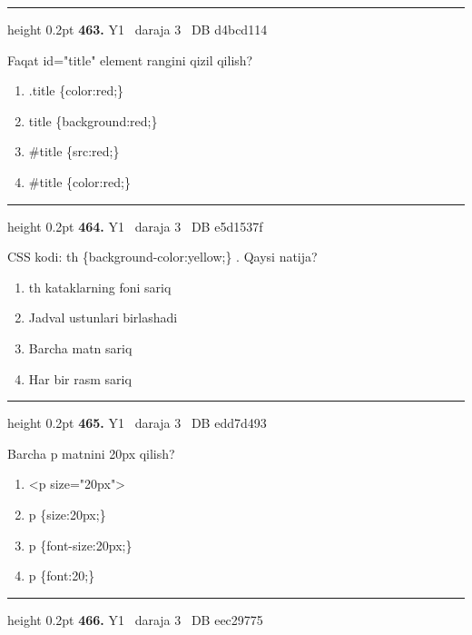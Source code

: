 \documentclass[10pt,a4paper,oneside]{article}
\begin{document}
\vspace{2mm}\hrule height 0.2pt \vspace{4mm}
\hypertarget{q463}{\textbf{\color{ink}463.}}  {\color{muted}\scriptsize Y1 \textbullet\ daraja 3 \textbullet\ DB d4bcd114}
\par
Faqat id="title" element rangini qizil qilish?
\begin{enumerate}[label=\Alph*),leftmargin=9mm]
\item .title \{color:red;\}
\item title \{background:red;\}
\item \#title \{src:red;\}
\item \#title \{color:red;\}
\end{enumerate}
\vspace{2mm}\hrule height 0.2pt \vspace{4mm}
\hypertarget{q464}{\textbf{\color{ink}464.}}  {\color{muted}\scriptsize Y1 \textbullet\ daraja 3 \textbullet\ DB e5d1537f}
\par
CSS kodi: th \{background-color:yellow;\} . Qaysi natija?
\begin{enumerate}[label=\Alph*),leftmargin=9mm]
\item th kataklarning foni sariq
\item Jadval ustunlari birlashadi
\item Barcha matn sariq
\item Har bir rasm sariq
\end{enumerate}
\vspace{2mm}\hrule height 0.2pt \vspace{4mm}
\hypertarget{q465}{\textbf{\color{ink}465.}}  {\color{muted}\scriptsize Y1 \textbullet\ daraja 3 \textbullet\ DB edd7d493}
\par
Barcha p matnini 20px qilish?
\begin{enumerate}[label=\Alph*),leftmargin=9mm]
\item \textless{}p size="20px"\textgreater{}
\item p \{size:20px;\}
\item p \{font-size:20px;\}
\item p \{font:20;\}
\end{enumerate}
\vspace{2mm}\hrule height 0.2pt \vspace{4mm}
\hypertarget{q466}{\textbf{\color{ink}466.}}  {\color{muted}\scriptsize Y1 \textbullet\ daraja 3 \textbullet\ DB eec29775}
\end{document}
